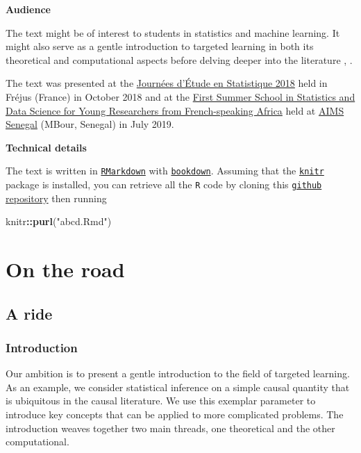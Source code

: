 \documentclass[11pt,openright,twoside]{book}
\newenvironment{Shaded}{\begin{snugshade}}{\end{snugshade}}
\newcommand{\KeywordTok}[1]{\textcolor[rgb]{0.13,0.29,0.53}{\textbf{#1}}}
\newcommand{\NormalTok}[1]{#1}
\newcommand{\OperatorTok}[1]{\textcolor[rgb]{0.81,0.36,0.00}{\textbf{#1}}}
\newcommand{\StringTok}[1]{\textcolor[rgb]{0.31,0.60,0.02}{#1}}
\theoremstyle{definition}
\theoremstyle{definition}
\theoremstyle{definition}
\theoremstyle{remark}
\begin{document}
\textbf{Audience}

The text might be of interest to students in statistics and machine
learning. It might also serve as a gentle introduction to targeted learning in
both its theoretical and computational aspects before delving deeper into the
literature \citep{TMLEbook11}, \citep{TMLEbook18}.

The text was presented at the \href{https://www.sfds.asso.fr/fr/group/activites_et_parrainages/608-journees_detude_en_statistique/}{Journées d'Étude en Statistique
2018}
held in Fréjus (France) in October 2018 and at the \href{https://ehermellin.github.io/conf_sfds/index.html}{First Summer School in
Statistics and Data Science for Young Researchers from French-speaking
Africa} held at \href{https://aims-senegal.org/}{AIMS
Senegal} (MBour, Senegal) in July 2019.

\textbf{Technical details}

The text is written in \href{https://rmarkdown.rstudio.com}{\texttt{RMarkdown}}
with \href{https://bookdown.org}{\texttt{bookdown}}. Assuming that
the \href{https://yihui.name/knitr/}{\texttt{knitr}} package is installed, you can
retrieve all the \texttt{R} code by cloning this \href{https://github.com/achambaz/tlride}{\texttt{github}
repository} then running

\begin{Shaded}
\begin{Highlighting}[]
\NormalTok{knitr}\OperatorTok{::}\KeywordTok{purl}\NormalTok{(}\StringTok{"abcd.Rmd"}\NormalTok{)}
\end{Highlighting}
\end{Shaded}

\hypertarget{part-on-the-road}{%
\part{On the road}\label{part-on-the-road}}

\hypertarget{a-ride}{%
\chapter{A ride}\label{a-ride}}

\hypertarget{introduction}{%
\section{Introduction}\label{introduction}}

Our ambition is to present a gentle introduction to the field of targeted
learning. As an example, we consider statistical inference on a simple causal
quantity that is ubiquitous in the causal literature. We use this exemplar
parameter to introduce key concepts that can be applied to more complicated
problems. The introduction weaves together two main threads, one theoretical
and the other computational.
\end{document}
